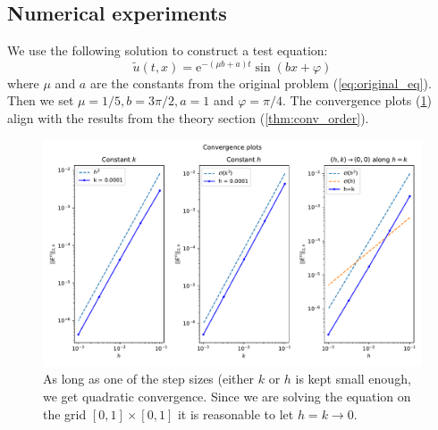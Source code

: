 \subsection{Numerical experiments}
We use the following solution to construct a test equation:
\begin{equation}
  \tilde{u}(t, x) = \text{e}^{-(\mu b + a)t} \sin (bx + \varphi)
\end{equation}
where \( \mu  \) and \( a \) are the constants from the original problem
(\eqref{eq:original_eq}).
Then we set \( \mu = 1/5, b = 3\pi/2, a = 1 \) and \( \varphi = \pi/4 \).
The convergence plots (\ref{fig:conv_plot})
align with the results from the theory section (\ref{thm:conv_order}).
\begin{figure}[!h]
    \centering
    \includegraphics[width=\textwidth]{Images/plots/task1_error.pdf}
    \caption{As long as one of the step sizes (either \( k\) or \( h \)
      is kept small enough, we get quadratic convergence.
      Since we are solving the equation on the grid 
      \( [0,1] \times [0,1] \) it is reasonable to let
      \( h=k \to 0 \).
    }
    \label{fig:conv_plot}
\end{figure}
